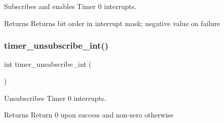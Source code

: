 Subscribes and enables Timer 0 interrupts. 

\begin{DoxyReturn}{Returns}
Returns bit order in interrupt mask; negative value on failure 
\end{DoxyReturn}
\hypertarget{group__timer_gab9eea51549744bca5c5c923b388bb4ee}{}\label{group__timer_gab9eea51549744bca5c5c923b388bb4ee} 
\subsubsection{\texorpdfstring{timer\+\_\+unsubscribe\+\_\+int()}{timer\_unsubscribe\_int()}}
{\footnotesize\ttfamily int timer\+\_\+unsubscribe\+\_\+int (\begin{DoxyParamCaption}{ }\end{DoxyParamCaption})}



Unsubscribes Timer 0 interrupts. 

\begin{DoxyReturn}{Returns}
Return 0 upon success and non-\/zero otherwise 
\end{DoxyReturn}
